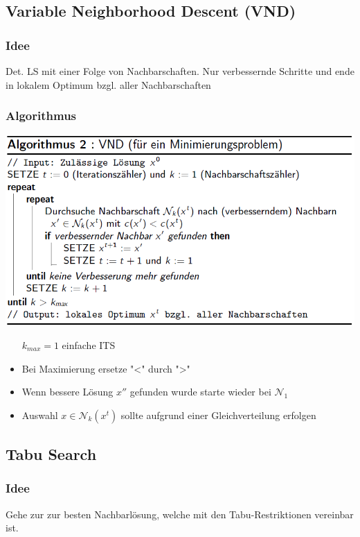 \documentclass[12pt]{article}
\begin{document}
		\subsection{Variable Neighborhood Descent (VND)}
			\subsubsection{Idee}
				Det. LS mit einer Folge von Nachbarschaften. Nur verbessernde Schritte und ende in lokalem Optimum bzgl. aller Nachbarschaften
			\subsubsection{Algorithmus}
				\includegraphics[scale=0.6]{VNS}
				\begin{itemize}
					\item[\texttt{$k_{max}=1$}] einfache ITS
					\item Bei Maximierung ersetze "<" durch ">"
					\item Wenn bessere Lösung $x''$ gefunden wurde starte wieder bei $\mathcal{N}_1$
					\item Auswahl $x\in\mathcal{N}_k(x^t)$ sollte aufgrund einer Gleichverteilung erfolgen
				\end{itemize}
		\subsection{Tabu Search}\label{TabuSearch}
			\subsubsection{Idee}
				Gehe zur zur besten Nachbarlösung, welche mit den Tabu-Restriktionen vereinbar ist.
\end{document}
